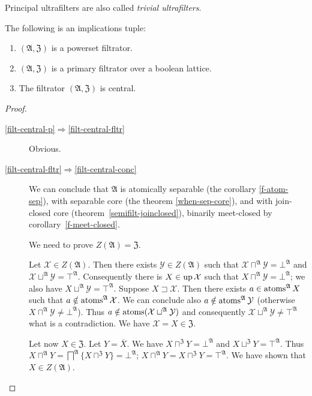\begin{defn}
Principal ultrafilters are also called
\emph{trivial ultrafilters}.\end{defn}
\begin{thm}
\label{pow-filt-central}The following is an implications tuple:
\begin{enumerate}
\item \label{filt-central-p}$(\mathfrak{A},\mathfrak{Z})$ is a powerset
filtrator.
\item \label{filt-central-fltr}$(\mathfrak{A},\mathfrak{Z})$ is a primary
filtrator over a boolean lattice.
\item \label{filt-central-conc}The filtrator $(\mathfrak{A},\mathfrak{Z})$
is central.
\end{enumerate}
\end{thm}
\begin{proof}
~
\begin{description}
\item [{\ref{filt-central-p}$\Rightarrow$\ref{filt-central-fltr}}] Obvious.
\item [{\ref{filt-central-fltr}$\Rightarrow$\ref{filt-central-conc}}] We
can conclude that $\mathfrak{A}$ is atomically separable (the corollary
\ref{f-atom-sep}), with separable core (the theorem \ref{when-sep-core}),
and with join-closed core (theorem~\ref{semifilt-joinclosed}),
binarily meet-closed by corollary~\ref{f-meet-closed}.


We need to prove $Z(\mathfrak{A})=\mathfrak{Z}$.


Let $\mathcal{X}\in Z(\mathfrak{A})$. Then there exists $\mathcal{Y}\in Z(\mathfrak{A})$
such that $\mathcal{X}\sqcap^{\mathfrak{A}}\mathcal{Y}=\bot^{\mathfrak{A}}$
and $\mathcal{X}\sqcup^{\mathfrak{A}}\mathcal{Y}=\top^{\mathfrak{A}}$.
Consequently there is $X\in\operatorname{up}\mathcal{X}$ such that $X\sqcap^{\mathfrak{A}}\mathcal{Y}=\bot^{\mathfrak{A}}$;
we also have $X\sqcup^{\mathfrak{A}}\mathcal{Y}=\top^{\mathfrak{A}}$.
Suppose $X\sqsupset\mathcal{X}$. Then there exists $a\in\operatorname{atoms}^{\mathfrak{A}}X$
such that $a\notin\operatorname{atoms}^{\mathfrak{A}}\mathcal{X}$. We can conclude
also $a\notin\operatorname{atoms}^{\mathfrak{A}}\mathcal{Y}$ (otherwise $X\sqcap^{\mathfrak{A}}\mathcal{Y}\ne\bot^{\mathfrak{A}}$).
Thus $a\notin\operatorname{atoms}(\mathcal{X}\sqcup^{\mathfrak{A}}\mathcal{Y})$
and consequently $\mathcal{X}\sqcup^{\mathfrak{A}}\mathcal{Y}\ne\top^{\mathfrak{A}}$
what is a contradiction. We have $\mathcal{X}=X\in\mathfrak{Z}$.


Let now $X\in\mathfrak{Z}$. Let $Y=\overline{X}$. We have $X\sqcap^{\mathfrak{Z}}Y=\bot^{\mathfrak{A}}$
and $X\sqcup^{\mathfrak{Z}}Y=\top^{\mathfrak{A}}$. Thus $X\sqcap^{\mathfrak{A}}Y=\bigsqcap^{\mathfrak{A}}\{X\sqcap^{\mathfrak{Z}}Y\}=\bot^{\mathfrak{A}}$;
$X\sqcap^{\mathfrak{A}}Y=X\sqcap^{\mathfrak{Z}}Y=\top^{\mathfrak{A}}$.
We have shown that $X\in Z(\mathfrak{A})$.

\end{description}
\end{proof}

